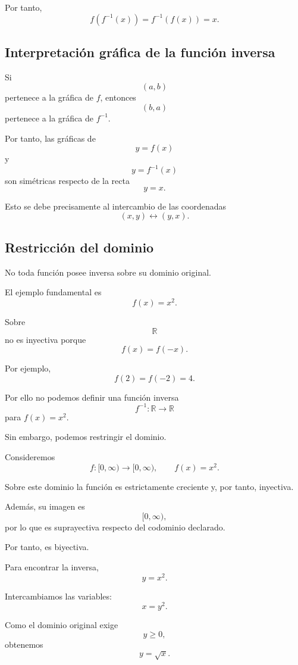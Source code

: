 \documentclass[12pt]{article}
\theoremstyle{remark}
\begin{document}
Por tanto,
\[
\boxed{
f(f^{-1}(x))
=
f^{-1}(f(x))
=
x.
}
\]

\subsection{Interpretación gráfica de la función inversa}

Si
\[
(a,b)
\]
pertenece a la gráfica de \(f\), entonces
\[
(b,a)
\]
pertenece a la gráfica de \(f^{-1}\).

Por tanto, las gráficas de
\[
y=f(x)
\]
y
\[
y=f^{-1}(x)
\]
son simétricas respecto de la recta
\[
\boxed{y=x}.
\]

Esto se debe precisamente al intercambio de las coordenadas
\[
(x,y)\longleftrightarrow(y,x).
\]

\subsection{Restricción del dominio}

No toda función posee inversa sobre su dominio original.

El ejemplo fundamental es
\[
f(x)=x^2.
\]

Sobre
\[
\mathbb{R}
\]
no es inyectiva porque
\[
f(x)=f(-x).
\]

Por ejemplo,
\[
f(2)=f(-2)=4.
\]

Por ello no podemos definir una función inversa
\[
f^{-1}:\mathbb{R}\longrightarrow\mathbb{R}
\]
para \(f(x)=x^2\).

Sin embargo, podemos restringir el dominio.

Consideremos
\[
f:[0,\infty)\longrightarrow[0,\infty),
\qquad
f(x)=x^2.
\]

Sobre este dominio la función es estrictamente creciente y, por tanto,
inyectiva.

Además, su imagen es
\[
[0,\infty),
\]
por lo que es suprayectiva respecto del codominio declarado.

Por tanto, es biyectiva.

Para encontrar la inversa,
\[
y=x^2.
\]

Intercambiamos las variables:
\[
x=y^2.
\]

Como el dominio original exige
\[
y\geq0,
\]
obtenemos
\[
y=\sqrt{x}.
\]
\end{document}
